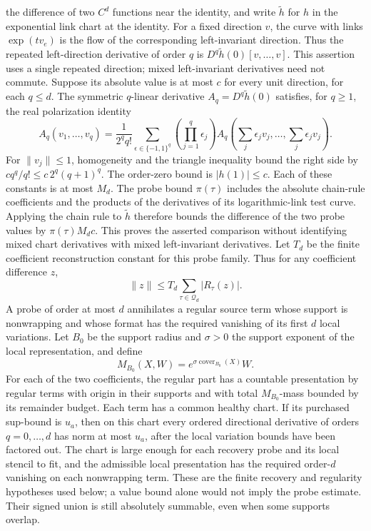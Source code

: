 the difference of two $C^d$ functions near the identity, and write $\widetilde h$ for $h$ in
the exponential link chart at the identity. For a fixed direction $v$,
the curve with links $\exp(tv_e)$ is the flow of the corresponding
left-invariant direction. Thus the repeated left-direction derivative
of order $q$ is
$D^q\widetilde h(0)[v,\ldots,v]$. This assertion uses a single repeated
direction; mixed left-invariant derivatives need not commute.
Suppose its absolute value is at most $c$ for every unit direction,
for each $q\le d$. The symmetric $q$-linear derivative $A_q=D^q\widetilde h(0)$
satisfies, for $q\ge1$, the real polarization identity
\[
 A_q(v_1,\ldots,v_q)=\frac1{2^q q!}
 \sum_{\epsilon\in\{-1,1\}^q}
 \left(\prod_{j=1}^q\epsilon_j\right)
 A_q\left(\sum_j\epsilon_jv_j,\ldots,\sum_j\epsilon_jv_j\right).
\]
For $\|v_j\|\le1$, homogeneity and the triangle inequality bound the
right side by $cq^q/q!\le c\,2^q(q+1)^q$. The order-zero bound is
$|h(1)|\le c$. Each of these constants is at most $M_d$.
The probe bound $\pi(\tau)$ includes the absolute chain-rule coefficients
and the products of the derivatives of its logarithmic-link test curve.
Applying the chain rule to $\widetilde h$ therefore bounds the difference
of the two probe values by $\pi(\tau)M_dc$. This proves the asserted
comparison without identifying mixed chart derivatives with mixed
left-invariant derivatives. Let \(T_d\) be the finite coefficient reconstruction constant for this probe family. Thus for any
coefficient difference \(z\),
\[
 \|z\|\leq T_d\sum_{\tau\in\mathcal Q_d}|R_\tau(z)|.
\]
A probe of order at most \(d\) annihilates a regular source term whose
support is nonwrapping and whose format has the required vanishing of its
first \(d\) local variations. Let \(B_0\) be the support radius and
\(\sigma>0\) the support exponent of the local representation, and define
\[
 M_{B_0}(X,W)=e^{\sigma\operatorname{cover}_{B_0}(X)}W.
\]
For each of the two coefficients, the regular part has a countable
presentation by regular terms with origin in their supports and with total
\(M_{B_0}\)-mass bounded by its remainder budget. Each term has a common
healthy chart. If its purchased sup-bound is \(u_a\), then on this chart
every ordered directional derivative of orders \(q=0,\ldots,d\) has norm at
most \(u_a\), after the local variation bounds have been factored out.
The chart is large enough for each recovery probe and its local stencil to
fit, and the admissible local presentation has the required order-\(d\)
vanishing on each nonwrapping term. These are the finite recovery and
regularity hypotheses used below; a value bound alone would not imply the
probe estimate. Their signed union is still absolutely summable, even when
some supports overlap.

